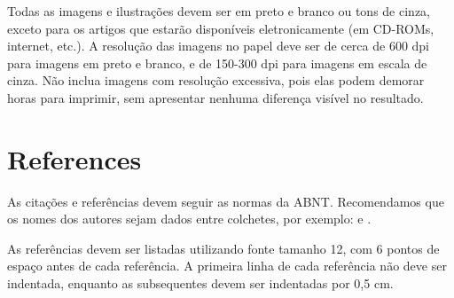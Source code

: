 \documentclass[12pt]{article}
\begin{document}
Todas as imagens e ilustrações devem ser em preto e branco ou tons de cinza, exceto para os artigos que estarão disponíveis eletronicamente (em CD-ROMs, internet, etc.). A resolução das imagens no papel deve ser de cerca de 600 dpi para imagens em preto e branco, e de 150-300 dpi para imagens em escala de cinza. Não inclua imagens com resolução excessiva, pois elas podem demorar horas para imprimir, sem apresentar nenhuma diferença visível no resultado.



\section{References}

As citações e referências devem seguir as normas da ABNT. Recomendamos que os nomes dos autores sejam dados entre colchetes, por exemplo: \cite{kolevaPropertiesMixedReality1999} e \cite{toriIntroducaoRealidadeVirtual2020}.

As referências devem ser listadas utilizando fonte tamanho 12, com 6 pontos de espaço antes de cada referência. A primeira linha de cada referência não deve ser indentada, enquanto as subsequentes devem ser indentadas por 0,5 cm.



\end{document}
